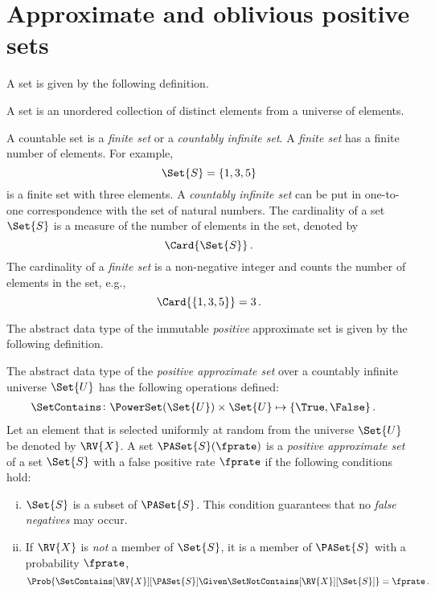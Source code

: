 \documentclass[ ../main.tex]{subfiles}
\begin{document}
\section{Approximate and oblivious positive sets}
A set is given by the following definition.
\begin{definition}
A set is an unordered collection of distinct elements from a universe of elements.
\end{definition}
A countable set is a \emph{finite set} or a \emph{countably infinite set}. A \emph{finite set} has a finite number of elements. For example,
\[
    \Set{S} = \{ 1, 3, 5 \}
\]
is a finite set with three elements. A \emph{countably infinite set} can be put in one-to-one correspondence with the set of natural numbers. The cardinality of a set $\Set{S}$ is a measure of the number of elements in the set, denoted by
\begin{equation}
    \Card{\Set{S}}\,.
\end{equation}
The cardinality of a \emph{finite set} is a non-negative integer and counts the number of elements in the set, e.g.,
\[
    \Card{\left\{ 1, 3, 5\right\}} = 3\,.
\]

The abstract data type of the immutable \emph{positive} approximate set\cite{aset} is given by the following definition.
\begin{definition}
\label{def:approx_set}
The abstract data type of the \emph{positive approximate set} over a countably infinite universe $\Set{U}$ has the following operations defined:
\begin{align}
    &\SetContains \colon \PowerSet(\Set{U}) \times \Set{U} \mapsto \{ \True, \False \}\,.
\end{align}
Let an element that is selected uniformly at random from the universe $\Set{U}$ be denoted by $\RV{X}$.
A set $\PASet{S}(\fprate)$ is a \emph{positive approximate set} of a set $\Set{S}$ with a false positive rate $\fprate$ if the following conditions hold:
\begin{enumerate}[(i)]
    \item $\Set{S}$ is a subset of $\PASet{S}$.
    This condition guarantees that no \emph{false negatives} may occur.
    \item If $\RV{X}$ is \emph{not} a member of $\Set{S}$, it is a member of $\PASet{S}$ with a probability $\fprate$,
    \begin{equation}
        \Prob{\SetContains[\RV{X}][\PASet{S}] \Given \SetNotContains[\RV{X}][\Set{S}]} = \fprate\,.
    \end{equation}
\end{enumerate}
\end{definition}
\end{document}
